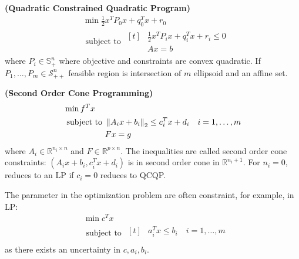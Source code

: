 \begin{definition}{\textbf{(Quadratic Constrained Quadratic Program)}}
    \begin{equation*}
    \begin{aligned}
        &\min \frac{1}{2}x^TP_0x + q_0^Tx + r_0 \\
        &\text{ subject to } \begin{aligned}[t]
            &\frac{1}{2}x^TP_ix + q_i^Tx + r_i \le 0 \\
            &Ax=b
        \end{aligned}
    \end{aligned}
    \end{equation*}
    where $P_i\in\mathbb{S}^n_+$ where objective and constraints are convex quadratic. If $P_1,\dots,P_m\in\mathcal{S}^n_{++}$ feasible region is intersection of $m$ ellipsoid and an affine set. 
\end{definition}

\begin{definition}{\textbf{(Second Order Cone Programming)}}
    \begin{equation*}
    \begin{aligned}
        &\min f^Tx \\
        &\text{ subject to } \begin{aligned}[t]
            &\left\lVert A_ix+b_i\right\rVert_2 \le c_i^Tx+d_i \quad i=1,\dots,m \\
            &Fx=g
        \end{aligned}
    \end{aligned}
    \end{equation*}
    where $A_i\in \mathbb{R}^{n_i\times n}$ and $F\in \mathbb{R}^{p\times n}$. The inequalities are called second order cone constraints: $(A_ix+b_i, c_i^Tx+d_i)$ is in second order cone in $\mathbb{R}^{n_i+1}$. For $n_i=0$, reduces to an LP if $c_i=0$ reduces to QCQP. 
\end{definition}

\begin{remark}
    The parameter in the optimization problem are often constraint, for example, in LP:
    \begin{equation*}
    \begin{aligned}
        &\min c^Tx \\
        &\text{ subject to } \begin{aligned}[t]
            &a_i^Tx\le b_i \quad i=1,\dots,m \\
        \end{aligned}
    \end{aligned}
    \end{equation*}
    as there exists an uncertainty in $c, a_i, b_i$. 
\end{remark}

